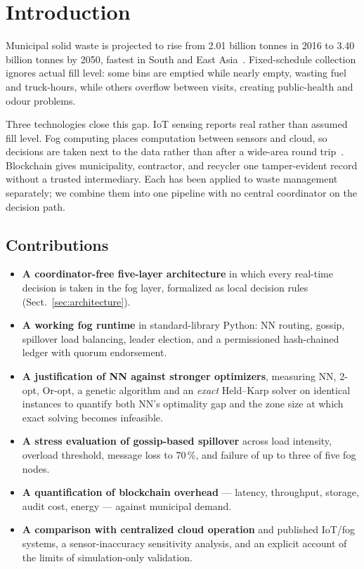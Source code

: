 \documentclass{llncs}
\begin{document}
\section{Introduction}
\label{sec:intro}

Municipal solid waste is projected to rise from 2.01 billion tonnes in 2016 to
3.40 billion tonnes by 2050, fastest in South and East Asia~\cite{worldbank}.
Fixed-schedule collection ignores actual fill level: some bins are emptied
while nearly empty, wasting fuel and truck-hours, while others overflow between
visits, creating public-health and odour problems.

Three technologies close this gap. IoT sensing reports real rather than assumed
fill level. Fog computing places computation between sensors and cloud, so
decisions are taken next to the data rather than after a wide-area round
trip~\cite{bonomi,shi}. Blockchain gives municipality, contractor, and recycler
one tamper-evident record without a trusted intermediary. Each has been applied
to waste management separately; we combine them into one pipeline with no
central coordinator on the decision path.

\subsection*{Contributions}
\begin{itemize}
  \item \textbf{A coordinator-free five-layer architecture} in which every
        real-time decision is taken in the fog layer, formalized as local
        decision rules (Sect.~\ref{sec:architecture}).
  \item \textbf{A working fog runtime} in standard-library Python: NN routing,
        gossip, spillover load balancing, leader election, and a permissioned
        hash-chained ledger with quorum endorsement.
  \item \textbf{A justification of NN against stronger optimizers}, measuring
        NN, 2-opt, Or-opt, a genetic algorithm and an \emph{exact} Held--Karp
        solver on identical instances to quantify both NN's optimality gap and
        the zone size at which exact solving becomes infeasible.
  \item \textbf{A stress evaluation of gossip-based spillover} across load
        intensity, overload threshold, message loss to 70\,\%, and failure of
        up to three of five fog nodes.
  \item \textbf{A quantification of blockchain overhead} --- latency,
        throughput, storage, audit cost, energy --- against municipal demand.
  \item \textbf{A comparison with centralized cloud operation} and published
        IoT/fog systems, a sensor-inaccuracy sensitivity analysis, and an
        explicit account of the limits of simulation-only validation.
\end{itemize}
\end{document}
